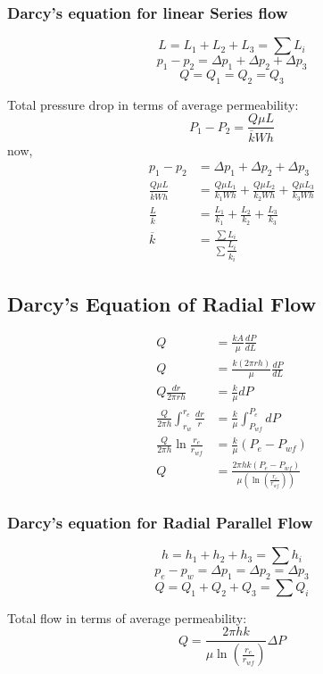 \documentclass{article}
\begin{document}
    \subsubsection*{Darcy’s equation for linear Series flow }
    $$L = L_1 + L_2 + L_3 = \sum L_i$$
    $$p_1 - p_2 = \Delta p_1 + \Delta p_2 + \Delta p_3$$
    $$Q = Q_1 = Q_2 = Q_3 $$

    Total pressure drop in terms of average permeability:
    $$P_1 - P_2 = \frac{Q \mu L}{\overline{k}W h}$$
    now, 
    \begin{align*}
        p_1 - p_2 &= \Delta p_1 + \Delta p_2 + \Delta p_3 \\ 
        \frac{Q \mu L}{\overline{k}W h} &= \frac{Q \mu L_1}{k_1W h} + \frac{Q \mu L_2}{k_2W h} + \frac{Q \mu L_3}{k_3W h} \\
        \frac{L}{\overline{k}} &= \frac{L_1}{k_1} + \frac{L_2}{k_2} + \frac{L_3}{k_3} \\
        \overline{k} &= \frac{\sum L_i}{\sum \dfrac{L_i}{k_i}}
    \end{align*}

    \subsection*{Darcy's Equation of Radial Flow}

    \begin{align*}
        Q &= \frac{kA}{\mu} \frac{dP}{dL} \\
        Q &= \frac{k (2 \pi r h)}{\mu} \frac{dP}{dL} \\
        Q \frac{dr}{2\pi r h} &= \frac{k}{\mu} dP \\
        \frac{Q}{2\pi h} \int_{r_w}^{r_e} \frac{dr}{r} &= \frac{k}{\mu} \int_{P_{wf}}^{P_e} dP \\
        \frac{Q}{2 \pi h} \ln \frac{r_e}{r_{wf}} &= \frac{k}{\mu} \left(P_e-P_{wf}\right) \\
        Q &= \frac{2\pi h k \left(P_e - P_{wf}\right)}{\mu \left(\ln \left(\frac{r_e}{r_{wf}}\right)\right)}
    \end{align*}

    \subsubsection*{Darcy’s equation for Radial Parallel Flow}
    $$h = h_1 + h_2 + h_3 = \sum h_i$$
    $$p_e - p_w = \Delta p_1 = \Delta p_2 = \Delta p_3$$
    $$Q = Q_1 + Q_2 + Q_3 = \sum Q_i$$

    Total flow in terms of average permeability:
    $$Q = \frac{2\pi h k }{\mu \ln \left(\frac{r_e}{r_{wf}}\right)} \Delta P $$
\end{document}
